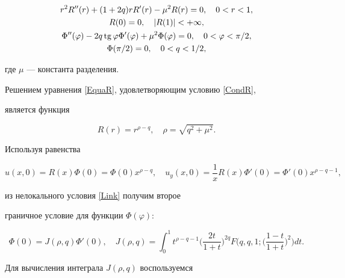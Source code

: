 \begin{gather}\label{EquaR}


r^2R''(r)+(1+2q)rR'(r)-\mu^2R(r)=0, \quad 0<r<1,\\


%


\label{CondR}


R(0)=0,\quad |R(1)|<+\infty,\\


%


\label{EquaPhi}


\Phi''(\varphi)-2q\tg\varphi\Phi'(\varphi)+\mu^2\Phi(\varphi)=0,


\quad 0<\varphi<\pi/2, \\


%


\label{CondPhi}


\Phi(\pi/2)=0,\quad 0<q<1/2,


\end{gather}


где $\mu$ --- константа разделения.


Решением уравнения \eqref{EquaR}, удовлетворяющим условию \eqref{CondR}, 


является функция


\begin{equation}\label{R}


R(r)=r^{\rho-q},\quad \rho=\sqrt{q^2+\mu^2}.


\end{equation}


Используя равенства


$$


u(x,0)=R(x)\Phi(0)=\Phi(0)x^{\rho-q},\quad


u_y(x,0)=\frac{1}{x} R(x)\Phi'(0)=\Phi'(0)x^{\rho-q-1},


$$


из нелокального условия \eqref{Link} получим второе


граничное условие для функции $\Phi(\varphi)$:


$$


\Phi(0)=J(\rho,q)\Phi'(0),\quad


J(\rho,q)=\int_0^1


t^{\rho-q-1}\bigg(\frac{2t}{1+t}\bigg)^{2q}


F\bigg(q,q,1;\bigg(\frac{1-t}{1+t}\bigg)^2\bigg)dt.


$$


Для вычисления интеграла $J(\rho,q)$ воспользуемся


